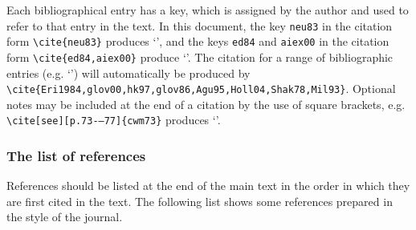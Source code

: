 \documentclass{gCOV2e}
\theoremstyle{plain}%
\theoremstyle{definition}
\theoremstyle{remark}
\begin{document}
Each bibliographical entry has a key, which is assigned by the author and used to refer to that entry in the text. In this document, the key \verb"neu83" in the citation form
\verb"\cite{neu83}" produces `\cite{neu83}', and the keys \verb"ed84" and \verb"aiex00" in the citation form
\verb"\cite{ed84,aiex00}" produce `\cite{ed84,aiex00}'. The citation for a range of bibliographic entries (e.g.
`\cite{Eri1984,glov00,hk97,glov86,Agu95,Holl04,Shak78,Mil93}') will automatically be produced by
\verb"\cite{Eri1984,glov00,hk97,glov86,Agu95,Holl04,Shak78,Mil93}". Optional notes may be included at the end of a citation by the use of square brackets, e.g. \verb"\cite[see][p.73-–77]{cwm73}" produces `\cite[see][p.73--77]{cwm73}'.

\subsubsection{The list of references}

References should be listed at the end of the main text in the order in which they are first cited in the text. The following list shows some references prepared in the style of the journal.
\end{document}
